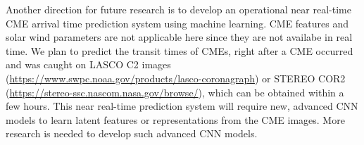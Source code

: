 \documentclass{article}
\begin{document}
Another direction for future research is to 
develop an operational near real-time CME arrival time prediction system
using machine learning.
CME features and solar wind parameters are not applicable here since they are not availabe in real time.
We plan to predict the transit times of CMEs, right after a CME occurred and was caught on LASCO C2 images (\url{https://www.swpc.noaa.gov/products/lasco-coronagraph}) or STEREO COR2 (\url{https://stereo-ssc.nascom.nasa.gov/browse/}), which can be obtained within a few hours.
This near real-time prediction system will require new, advanced CNN models to learn latent features 
or representations from the CME images.
More research is needed to develop such advanced CNN models.



%
\end{document}
